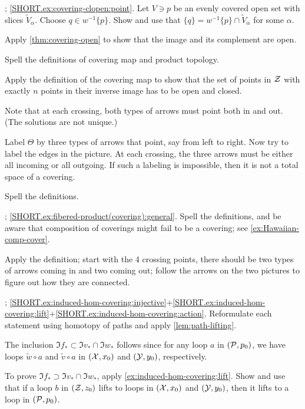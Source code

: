 \parbf{\ref{ex:covering-clopen}}; \ref{SHORT.ex:covering-clopen:point}.
Let $V\ni p$ be an evenly covered open set with slices $\tilde V_\alpha$.
Choose $q\in w^{-1}\{p\}$.
Show and use that $\{q\}=w^{-1}\{p\}\cap \tilde V_\alpha$ for some $\alpha$.

Apply \ref{thm:covering-open} to show that the image and its complement are open.

Spell the definitions of covering map and product topology.

Apply the definition of the covering map to show that the set of points in $\mathcal{Z}$ with exactly $n$ points in their inverse image has to be open and closed.

Note that at each crossing, both types of arrows must point both in and out.
(The solutions are not unique.)

Label $\Theta$ by three types of arrows that point, say from left to right.
Now try to label the edges in the picture.
At each crossing, the three arrows must be either all incoming or all outgoing.
If such a labeling is impossible, then it is not a total space of a covering.

Spell the definitions.

\parbf{\ref{ex:fibered-product(covering)}}; \ref{SHORT.ex:fibered-product(covering):general}.
Spell the definitions, and be aware that composition of coverings might fail to be a covering; see \ref{ex:Hawaiian-comp-cover}.

Apply the definition; start with the 4 crossing points, there should be two types of arrows coming in and two coming out;
follow the arrows on the two pictures to figure out how they are connected.

\parbf{\ref{ex:induced-hom-covering}};
\ref{SHORT.ex:induced-hom-covering:injective}+\ref{SHORT.ex:induced-hom-covering:lift}+\ref{SHORT.ex:induced-hom-covering:action}.
Reformulate each statement using homotopy of paths and apply \ref{lem:path-lifting}.

The inclusion $\Im f_*\subset \Im v_*\cap \Im w_*$ follows since for any loop $a$ in $(\mathcal{P},p_0)$, we have loops
$\tilde w\circ a$ and $\tilde v\circ a$ in $(\mathcal{X},x_0)$ and $(\mathcal{Y},y_0)$, respectively.

To prove $\Im f_*\supset \Im v_*\cap \Im w_*$, apply \ref{ex:induced-hom-covering:lift}.
Show and use that if a loop $b$ in $(\mathcal{Z},z_0)$ lifts to loops in $(\mathcal{X},x_0)$ and  $(\mathcal{Y},y_0)$, then it lifts to a loop in $(\mathcal{P},p_0)$.

